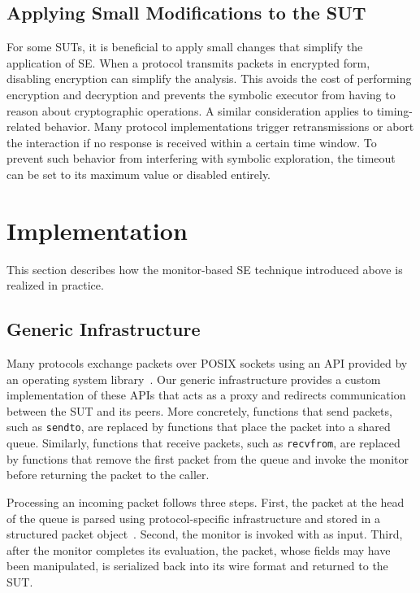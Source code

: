 \subsection{Applying Small Modifications to the SUT}
For some SUTs, it is beneficial to apply small changes that simplify the application of SE. 
When a protocol transmits packets in encrypted form, disabling encryption can simplify the analysis. 
This avoids the cost of performing encryption and decryption and prevents the symbolic executor from having to reason about cryptographic operations. 
A similar consideration applies to timing-related behavior. 
Many protocol implementations 
trigger retransmissions or abort the interaction if no response is received within a certain time window. To prevent such behavior from interfering with symbolic exploration, the timeout can be set to its maximum value or disabled entirely.

\section{Implementation}
This section describes how the monitor-based SE technique introduced above is realized in practice.

\subsection{Generic Infrastructure}\label{sec:paper2:generic}
Many protocols exchange packets over POSIX sockets using an API provided by an operating system library~\cite{unix-network}.
Our generic infrastructure provides a custom implementation of these APIs that acts as a proxy and redirects communication between the SUT and its peers.
More concretely, functions that send packets, such as \texttt{sendto}, are replaced by functions that place the packet into a shared queue.
Similarly, functions that receive packets, such as \texttt{recvfrom}, are replaced by functions that remove the first packet from the queue and invoke the monitor before returning the packet to the caller.

Processing an incoming packet follows three steps. 
First, the packet at the head of the queue is parsed using protocol-specific infrastructure and stored in a structured packet object~. 
Second, the monitor is invoked with  as input. 
Third, after the monitor completes its evaluation, the packet, whose fields may have been manipulated, is serialized back into its wire format and returned to the SUT.

